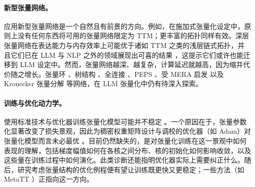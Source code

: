 \documentclass[11pt]{article}
\newcommand{\set}[1]{\mathrm{#1}}
\begin{document}


\paragraph{新型张量网络。}

应用新型张量网络是一个自然且有前景的方向。例如，在施加式张量化设定中，原则上没有任何东西将可用的张量网络限定为 TTM；更丰富的拓扑同样有效。深层张量网络在表达能力与内存效率上可能优于诸如 TTM 之类的浅层链式拓扑，并且它们已在 LLM 与 NLP 之外的领域展现出可喜的结果 \cite{adtn}，这提示它们或许也能迁移到 LLM 设定中。然而，张量网络越深、越复杂，计算延迟就越高，因为缩并代价随之增长。张量环 \cite{zhao2016tensorring}、树结构 \cite{gracedyck2010h_tucker}、全连接 \cite{zheng2021fctn}、PEPS \cite{verstraete2008peps}、受 MERA 启发 \cite{vidal2008mera} 以及 Kronecker 张量分解 \cite{batselier2017ktd} 等网络，在 LLM 张量化中仍有待深入探索。


\paragraph{训练与优化动力学。} 

使用标准技术与优化器训练张量化模型可能并不稳定 \cite{barratt2022tnunstabletraining}。一个原因在于，张量参数化显著改变了损失景观，因此为稠密权重矩阵设计与调校的优化器（如 Adam）对张量化模型而言未必最优 \cite{yang2024comera}。目前仍然缺失的，是对张量化训练在这一景观中如何表现的理解，包括梯度幅值如何在各核之间分布、核的初始化如何影响收敛，以及这些量在训练过程中如何演化。此类诊断还能指明优化器实际上需要纠正什么。随后，研究考虑张量结构的优化例程便有望让训练既更快又更稳定；一些方法（如 MetaTT \cite{lopezpiqueres2025metatt}）正指向这一方向。
\end{document}
